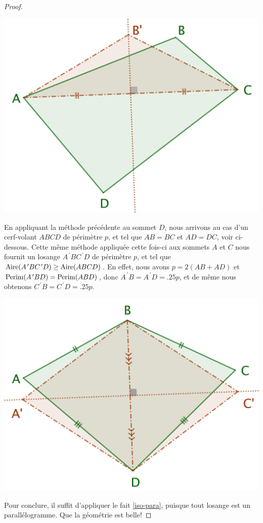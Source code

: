 \begin{proof}
	\begin{center}
		\includegraphics[scale=.4]{content/quadrilateral/quadrilateral-convex-gene.png}
	\end{center}
	
	
	En appliquant la méthode précédente au sommet $D$, nous arrivons au cas d'un cerf-volant $ABCD$ de périmètre $p$, et tel que $AB = BC$ et $AD = DC$, voir ci-dessous. 
	Cette même méthode appliquée cette fois-ci aux sommets $A$ et $C$ nous fournit un losange $A^{\,\prime}BC^{\,\prime}D$ de périmètre $p$, et tel que $\mathrm{Aire}(A^{\,\prime}BC^{\,\prime}D) \geq \mathrm{Aire}(ABCD)$.
	En effet, nous avons
	$p = 2(AB + AD)$
	et
	$\mathrm{Perim}(A^{\,\prime}BD) = \mathrm{Perim}(ABD)$,
	donc
	$A^{\,\prime}B = A^{\,\prime}D = \num{.25} p$,
	et de même nous obtenons
	$C^{\,\prime}B = C^{\,\prime}D = \num{.25} p$.

	\begin{center}
		\includegraphics[scale=.4]{content/quadrilateral/quadrilateral-convex-isopaire.png}
	\end{center}
	
	
	Pour conclure, il suffit d'appliquer le fait \ref{iso-para}, puisque tout losange est un parallélogramme. Que la géométrie est belle!
\end{proof}

